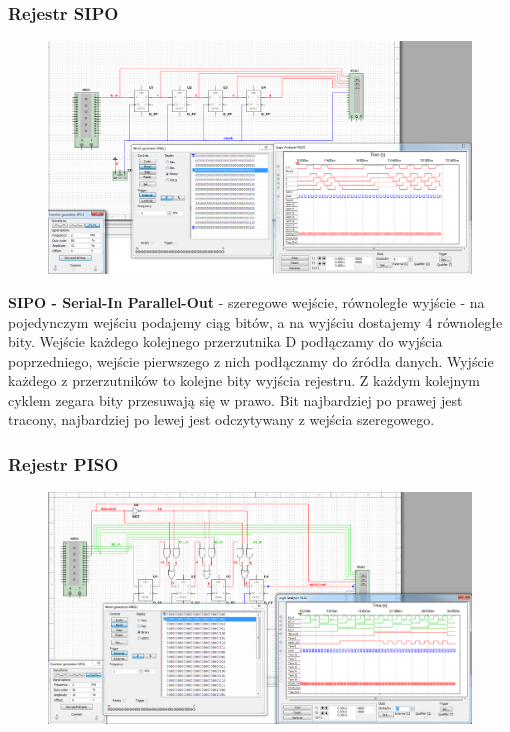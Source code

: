 \documentclass[12pt,a4paper]{article}
\begin{document}
\subsubsection{Rejestr SIPO}
\begin{figure}[H]
\centering
\includegraphics[width=\textwidth]{img/3hSIPO}
\end{figure}

\textbf{SIPO - Serial-In Parallel-Out} - szeregowe wejście, równoległe wyjście - na pojedynczym wejściu podajemy ciąg bitów, a na wyjściu dostajemy 4 równoległe bity. Wejście każdego kolejnego przerzutnika D podłączamy do wyjścia poprzedniego, wejście pierwszego z nich podłączamy do źródła danych. Wyjście każdego z przerzutników to kolejne bity wyjścia rejestru. Z każdym kolejnym cyklem zegara bity przesuwają się w prawo.
Bit najbardziej po prawej jest tracony, najbardziej po lewej jest odczytywany z wejścia szeregowego.

\subsubsection{Rejestr PISO}
\begin{figure}[H]
\centering
\includegraphics[width=\textwidth]{img/3hPISO}
\end{figure}
\end{document}
